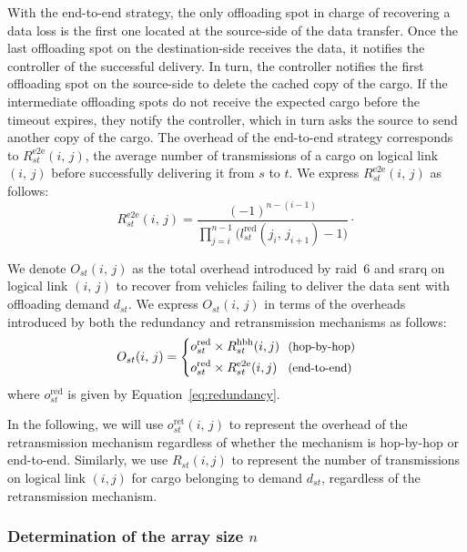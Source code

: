 With the end-to-end strategy, the only offloading spot in charge of recovering a data loss is the first one located at the source-side of the data transfer. Once the last offloading spot on the destination-side receives the data, it notifies the controller of the successful delivery. In turn, the controller notifies the first offloading spot on the source-side to delete the cached copy of the cargo. If the intermediate offloading spots do not receive the expected cargo before the timeout expires, they notify the controller, which in turn asks the source to send another copy of the cargo. The overhead of the end-to-end strategy corresponds to $R^{\textrm{e2e}}_{st}(i,\,j)$, the average number of transmissions of a cargo on logical link $(i,\,j)$ before successfully delivering it from $s$ to $t$. We express $R^{\textrm{e2e}}_{st}(i,\,j)$ as follows:
\begin{equation}
    R^{\textrm{e2e}}_{st}(i,\,j) = \frac{(-1)^{n-(i-1)}}{\prod_{j=i}^{n-1}\big(l_{st}^{\text{red}}(j_{i},\,j_{i+1})-1\big)}\cdot
\end{equation}

We denote $O_{st}(i,\,j)$ as the total overhead introduced by \acrshort{raid}~6 and \acrshort{srarq} on logical link $(i,\,j)$ to recover from vehicles failing to deliver the data sent with offloading demand $d_{st}$. We express $O_{st}(i,\,j)$ in terms of the overheads introduced by both the redundancy and retransmission mechanisms as follows:
\begin{equation}
    O_{st}(i,\,j) = \begin{dcases}
    o_{st}^{\text{red}} \times R_{st}^{\textrm{hbh}}(i,j) & \text{\!\!\small (hop-by-hop)}\\
    o_{st}^{\text{red}} \times R_{st}^{\textrm{e2e}}(i,j) & \text{\!\!\small (end-to-end)}
    \end{dcases}
\end{equation}
\noindent where $o_{st}^{\text{red}}$ is given by Equation~\ref{eq:redundancy}.

In the following, we will use $o^{\text{ret}}_{st}(i,\,j)$ to represent the overhead of the retransmission mechanism regardless of whether the mechanism is hop-by-hop or end-to-end. Similarly, we use $R_{st}(i,j)$ to represent the number of transmissions on logical link $(i,j)$ for cargo belonging to demand $d_{st}$, regardless of the retransmission mechanism.

\subsubsection{Determination of the array size $n$} 

